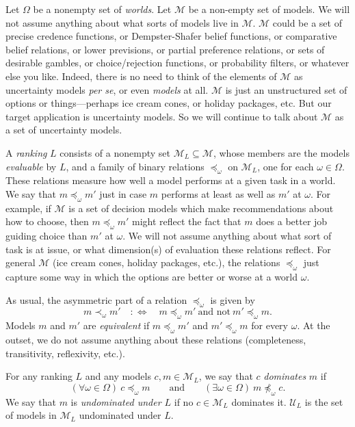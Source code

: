 \documentclass[11pt]{article}
\theoremstyle{definition}
\theoremstyle{remark}
\newcommand{\M}{\mathcal M}
\newcommand{\U}{\mathcal U}
\begin{document}
Let $\Omega$ be a nonempty set of \emph{worlds}. Let $\M$ be a non-empty set of models. We will not assume anything about what sorts of models live in $\M$. $\M$ could be a set of precise credence functions, or Dempster-Shafer belief functions, or comparative belief relations, or lower previsions, or partial preference relations, or sets of desirable gambles, or choice/rejection functions, or probability filters, or whatever else you like. Indeed, there is no need to think of the elements of $\M$ as uncertainty models \textit{per se}, or even \textit{models} at all. $\M$ is just an unstructured set of options or things---perhaps ice cream cones, or holiday packages, etc. But our target application is uncertainty models. So we will continue to talk about $\M$ as a set of uncertainty models.




A \emph{ranking} $L$ consists of a nonempty set $\M_L\subseteq\M$, whose members are the models \emph{evaluable} by $L$, and a family of binary relations $\preceq_\omega$ on $\M_L$, one for each $\omega\in\Omega$. These relations measure how well a model performs at a given task in a world. We say that $m\preceq_\omega m'$ just in case $m$ performs at least as well as $m'$ at $\omega$. For example, if $\M$ is a set of decision models which make recommendations about how to choose, then $m\preceq_\omega m'$ might reflect the fact that $m$ does a better job guiding choice than $m'$ at $\omega$. We will not assume anything about what sort of task is at issue, or what dimension(s) of evaluation these relations reflect. For general $\M$ (ice cream cones, holiday packages, etc.), the relations $\preceq_\omega$ just capture some way in which the options are better or worse at a world $\omega$.

As usual, the asymmetric part of a relation $\preceq_\omega$ is given by
\[
m\prec_\omega m'\quad:\Longleftrightarrow\quad m\preceq_\omega m'\ \text{and not}\ m'\preceq_\omega m .
\]
Models $m$ and $m'$ are \emph{equivalent} if $m\preceq_\omega m'$ and $m'\preceq_\omega m$ for every $\omega$. At the outset, we do not assume anything about these relations (completeness, transitivity, reflexivity, etc.).

For any ranking $L$ and any models $c,m\in\M_L$, we say that $c$ \emph{dominates} $m$ if
\[
(\forall\omega\in\Omega)\ c\preceq_\omega m\qquad\text{and}\qquad(\exists\omega\in\Omega)\ m\not\preceq_\omega c .
\]
We say that $m$ is \emph{undominated under $L$} if no $c\in\M_L$ dominates it. $\U_L$ is the set of models in $\M_L$ undominated under $L$.
\end{document}
